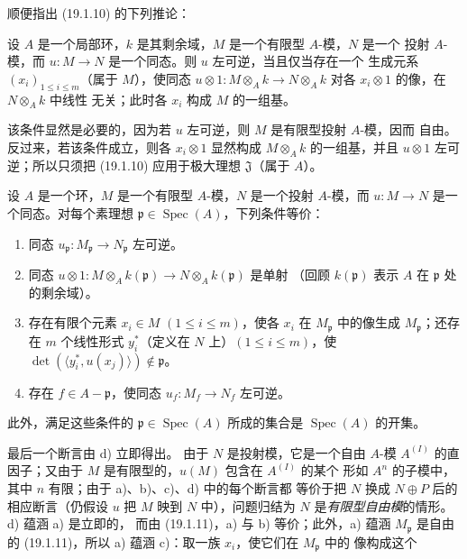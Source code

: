 顺便指出 (19.1.10) 的下列推论：

\begin{corollary}[19.1.11]
\label{0.19.1.11-fr}
设 $A$ 是一个局部环，$k$ 是其剩余域，$M$ 是一个有限型 $A$-模，$N$ 是一个
投射 $A$-模，而 $u:M\to N$ 是一个同态。则 $u$ 左可逆，当且仅当存在一个
生成元系 $(x_i)_{1\leq i\leq m}$（属于 $M$），使同态
$u\otimes 1:M\otimes_Ak\to N\otimes_Ak$ 对各 $x_i\otimes1$ 的像，在
$N\otimes_Ak$ 中线性
无关；此时各 $x_i$ 构成 $M$ 的一组基。
\end{corollary}

该条件显然是必要的，因为若 $u$ 左可逆，则 $M$ 是有限型投射 $A$-模，因而
自由。反过来，若该条件成立，则各 $x_i\otimes1$ 显然构成 $M\otimes_Ak$
的一组基，并且 $u\otimes1$ 左可逆；所以只须把 (19.1.10) 应用于极大理想
$\mathfrak J$（属于 $A$）。

\begin{corollary}[19.1.12]
\label{0.19.1.12-fr}
设 $A$ 是一个环，$M$ 是一个有限型 $A$-模，$N$ 是一个投射 $A$-模，而
$u:M\to N$ 是一个同态。对每个素理想
$\mathfrak p\in\operatorname{Spec}(A)$，下列条件等价：
\begin{enumerate}
  \item[a)] 同态 $u_{\mathfrak p}:M_{\mathfrak p}\to N_{\mathfrak p}$ 左可逆。
  \item[b)] 同态
  $u\otimes1:M\otimes_Ak(\mathfrak p)\to N\otimes_Ak(\mathfrak p)$ 是单射
  （回顾 $k(\mathfrak p)$ 表示 $A$ 在 $\mathfrak p$ 处的剩余域）。
  \item[c)] 存在有限个元素 $x_i\in M$ $(1\leq i\leq m)$，使各 $x_i$ 在
  $M_{\mathfrak p}$ 中的像生成 $M_{\mathfrak p}$；还存在 $m$ 个线性形式
  $y_i^*$（定义在 $N$ 上）$(1\leq i\leq m)$，使
  $\det(\langle y_i^*,u(x_j)\rangle)\notin\mathfrak p$。
  \item[d)] 存在 $f\in A-\mathfrak p$，使同态 $u_f:M_f\to N_f$ 左可逆。
\end{enumerate}
此外，满足这些条件的 $\mathfrak p\in\operatorname{Spec}(A)$ 所成的集合是
$\operatorname{Spec}(A)$ 的开集。
\end{corollary}

最后一个断言由 d) 立即得出。
由于 $N$ 是投射模，它是一个自由 $A$-模
$A^{(I)}$ 的直因子；又由于 $M$ 是有限型的，$u(M)$ 包含在 $A^{(I)}$ 的某个
形如 $A^n$ 的子模中，其中 $n$ 有限；由于 a)、b)、c)、d) 中的每个断言都
等价于把 $N$ 换成 $N\oplus P$ 后的相应断言（仍假设 $u$ 把 $M$ 映到 $N$
中），问题归结为 $N$ 是\emph{有限型自由模}的情形。d) 蕴涵 a) 是立即的，
而由 (19.1.11)，a) 与 b) 等价；此外，a) 蕴涵 $M_{\mathfrak p}$ 是自由的
(19.1.11)，所以 a) 蕴涵 c)：取一族 $x_i$，使它们在 $M_{\mathfrak p}$ 中的
像构成这个

